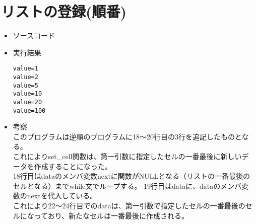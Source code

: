 \documentclass[a4paper]{jsarticle}
\begin{document}
\section{リストの登録(順番)}
	\begin{itemize}
	\item ソースコード
		 
		\mbox{}\newline
	\item 実行結果
		\begin{lstlisting}
value=1
value=2
value=5
value=10
value=20
value=100
		\end{lstlisting}
		\mbox{}\newline
	\item 考察\mbox{}\\
		このプログラムは逆順のプログラムに18〜20行目の3行を追記したものとなる。\\
		これによりset\_cell関数は、第一引数に指定したセルの一番最後に新しいデータを作成することになった。\\
		18行目はdataのメンバ変数nextに関数がNULLとなる（リストの一番最後のセルとなる）までwhile文でループする。
		19行目はdataに、dataのメンバ変数のnextを代入している。\\
		これにより22〜24行目でのdataは、第一引数で指定したセルの一番最後のセルになっており、新たなセルは一番最後に作成される。
	\end{itemize}
\end{document}
